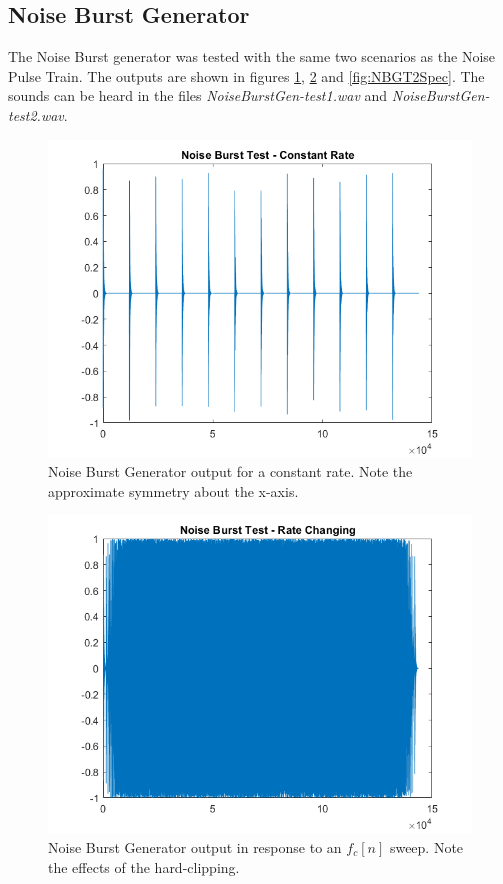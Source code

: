 \documentclass[../main.tex]{subfiles}
\begin{document}
\clearpage

\subsection{Noise Burst Generator}
The Noise Burst generator was tested with the same two scenarios as the Noise Pulse Train. The outputs are shown in figures \ref{fig:NBGT1}, \ref{fig:NBGT2} and \ref{fig:NBGT2Spec}. The sounds can be heard in the files \emph{NoiseBurstGen-test1.wav} and \emph{NoiseBurstGen-test2.wav}.

\begin{figure}[h]
    \centering
    \includegraphics[scale=.65]{./images/plots/NBGTest1.png}
    \caption{Noise Burst Generator output for a constant rate. Note the approximate symmetry about the x-axis.}
    \label{fig:NBGT1}
\end{figure}

\begin{figure}[h]
    \centering
    \includegraphics[scale=.65]{./images/plots/NBGTest2.png}
    \caption{Noise Burst Generator output in response to an $f_c[n]$ sweep. Note the effects of the hard-clipping.}
    \label{fig:NBGT2}
\end{figure}
\end{document}
